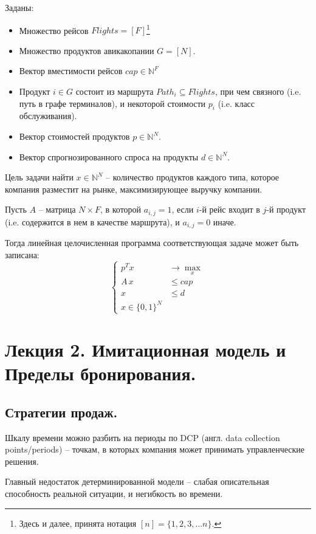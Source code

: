 \documentclass[reqno]{article}
\theoremstyle{definition}
\theoremstyle{definition}
\theoremstyle{definition}
\theoremstyle{definition}
\theoremstyle{definition}
\theoremstyle{definition}
\theoremstyle{definition}
\theoremstyle{definition}
\theoremstyle{definition}
\begin{document}
		Заданы:
		\begin{itemize}
			\item Множество рейсов $Flights = [F]$\footnote{Здесь и далее, принята нотация $[n] = \{1, 2, 3, ... n\}$.}
			\item Множество продуктов авикакопании $G = [N]$.
			\item Вектор вместимости рейсов $cap \in \mathds{N}^F$
			\item Продукт $i \in G$ состоит из маршрута $Path_i \subseteq Flights$, при чем связного (i.e. путь в графе терминалов), и некоторой стоимости $p_i$ (i.e. класс обслуживания).
			\item Вектор стоимостей продуктов $p \in \mathds{N}^N$.
			\item Вектор спрогнозированного спроса на продукты $d \in \mathds{N}^N$.
		
		\end{itemize}
	
		Цель задачи найти $x \in \mathds{N}^N$ -- количество продуктов каждого типа, которое компания разместит на рынке, максимизирующее выручку компании.
		
		Пусть $A$ -- матрица $N\times F$, в которой $a_{i, j} = 1$, если $i$-й рейс входит в $j$-й продукт (i.e. содержится в нем в качестве маршрута), и $a_{i, j} = 0$ иначе.
		
		Тогда линейная целочисленная программа соответствующая задаче может быть записана:
		$$
		\begin{cases}
			p^T x &\rightarrow \max_x\\
			A\,x  &\leq cap\\
			x     &\leq d\\
			x \in \{0, 1\}^N &
		\end{cases}
		$$
	
	
	
	\newpage
	\section{Лекция 2. Имитационная модель и Пределы бронирования.}
		\subsection{Стратегии продаж.}
		
		Шкалу времени можно разбить на периоды по DCP (англ. data collection points/periods) -- точкам, в которых компания может принимать управленческие решения.
		
		Главный недостаток детерминированной модели -- слабая описательная способность реальной ситуации, и негибкость во времени.
		
\end{document}
